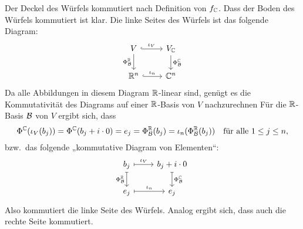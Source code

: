 \documentclass[a4paper,10pt]{article}
\begin{document}
Der Deckel des Würfels kommutiert nach Definition von $f_{\mathbb{C}}$.
Dass der Boden des Würfels kommutiert ist klar.
Die linke Seites des Würfels ist das folgende Diagram:
\[
  \begin{tikzcd}
      V
      \arrow[r, hookrightarrow, "\iota_V"]
      \arrow[d, "\Phi^\Rbb_\mc{B}"']
    & V_\Cbb
      \arrow[d, "\Phi^\Cbb_\mc{B}"]
    \\
      \Rbb^n
      \arrow[r, hookrightarrow, "\iota_n"]
    & \Cbb^n
  \end{tikzcd}
\]
Da alle Abbildungen in diesem Diagram $\mathbb{R}$-linear sind, genügt es die Kommutativität des Diagrams auf einer $\mathbb{R}$-Basis von $V$ nachzurechnen
Für die $\mathbb{R}$-Basis $\mathcal{B}$ von $V$ ergibt sich, dass
\[
  \Phi^{\mathbb{C}}(\iota_V(b_j))
  = \Phi^{\mathbb{C}}(b_j + i \cdot 0)
  = e_j
  = \Phi^{\mathbb{R}}_{\mathcal{B}}(b_j)
  = \iota_n(\Phi^{\mathbb{R}}_{\mathcal{B}}(b_j))
  \quad
  \text{für alle $1 \leq j \leq n$},
\]
bzw.\ das folgende „kommutative Diagram von Elementen“:
\[
  \begin{tikzcd}
      b_j
      \arrow[r, maps to, "\iota_V"]
      \arrow[d, maps to, "\Phi^\Rbb_\mc{B}"']
    & b_j + i \cdot 0
      \arrow[d, maps to, "\Phi^\Cbb_\mc{B}"]
    \\
      e_j
      \arrow[r, maps to, "\iota_n"]
    & e_j
  \end{tikzcd}
\]
Also kommutiert die linke Seite des Würfels.
Analog ergibt sich, dass auch die rechte Seite kommutiert.
\end{document}
